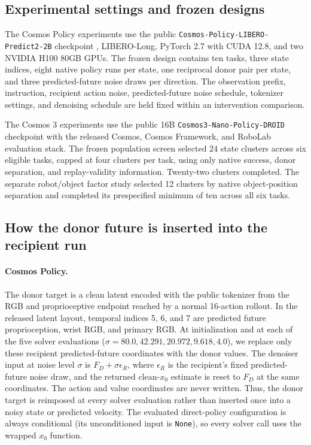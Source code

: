 \documentclass{article}
\begin{document}
\subsection{Experimental settings and frozen designs}
\label{app:settings}

The Cosmos Policy experiments use the public \texttt{Cosmos-Policy-LIBERO-Predict2-2B} checkpoint \citep{nvidia2026cosmospolicylibero}, LIBERO-Long, PyTorch 2.7 with CUDA 12.8, and two NVIDIA H100 80GB GPUs. The frozen design contains ten tasks, three state indices, eight native policy runs per state, one reciprocal donor pair per state, and three predicted-future noise draws per direction. The observation prefix, instruction, recipient action noise, predicted-future noise schedule, tokenizer settings, and denoising schedule are held fixed within an intervention comparison.

The Cosmos 3 experiments use the public 16B \texttt{Cosmos3-Nano-Policy-DROID} checkpoint with the released Cosmos, Cosmos Framework, and RoboLab evaluation stack. The frozen population screen selected 24 state clusters across six eligible tasks, capped at four clusters per task, using only native success, donor separation, and replay-validity information. Twenty-two clusters completed. The separate robot/object factor study selected 12 clusters by native object-position separation and completed its prespecified minimum of ten across all six tasks.

\subsection{How the donor future is inserted into the recipient run}
\label{app:future_replacement_impl}

\paragraph{Cosmos Policy.}
The donor target is a clean latent encoded with the public tokenizer from the RGB and proprioceptive endpoint reached by a normal 16-action rollout. In the released latent layout, temporal indices 5, 6, and 7 are predicted future proprioception, wrist RGB, and primary RGB. At initialization and at each of the five solver evaluations ($\sigma=80.0,42.291,20.972,9.618,4.0$), we replace only these recipient predicted-future coordinates with the donor values. The denoiser input at noise level $\sigma$ is $F_D+\sigma\epsilon_R$, where $\epsilon_R$ is the recipient's fixed predicted-future noise draw, and the returned clean-$x_0$ estimate is reset to $F_D$ at the same coordinates. The action and value coordinates are never written. Thus, the donor target is reimposed at every solver evaluation rather than inserted once into a noisy state or predicted velocity. The evaluated direct-policy configuration is always conditional (its unconditioned input is \texttt{None}), so every solver call uses the wrapped $x_0$ function.
\end{document}

